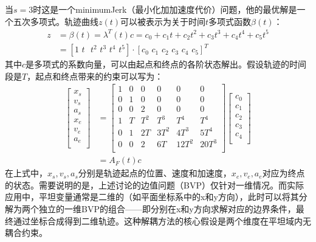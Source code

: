 \documentclass[master,academic]{ysuthesis} %
\begin{document}
		当$s=3$时这是一个minimumJerk（最小化加加速度代价）问题，他的最优解是一个五次多项式\cite{wang2022geometrically}。轨迹曲线$z(t)$可以被表示为关于时间$t$多项式函数$\beta(t)$：
		\begin{equation}
			\begin{aligned}
				z&=\beta (t) =\lambda ^T(t) c=c_0+c_1t+c_2t^2+c_3t^3+c_4t^4+c_5t^5\\
				&=\left[ 1\,\,t\,\,\,\,t^2\,\,t^3\,\,t^4\,\,t^5 \right] \cdot \left[ c_0\,\,c_1\,\,c_2\,\,c_3\,\,c_4\,\,c_5 \right] ^T
			\end{aligned}
		\end{equation}
		其中$c$是多项式的系数向量，可以由起点和终点的各阶状态解出。假设轨迹的时间段是$T$，起点和终点带来的约束可以写为：
		\begin{equation}
			\begin{aligned}
				\left[ \begin{array}{c}
				x_s\\
				v_s\\
				a_s\\
				x_e\\
				v_e\\
				a_e\\
				\end{array} \right] 
				&=\left[ \begin{matrix}
				1&		0&		0&		0&		0&		0\\
				0&		1&		0&		0&		0&		0\\
				0&		0&		2&		0&		0&		0\\
				1&		T&		T^2&		T^3&		T^4&		T^4\\
				0&		1&		2T&		3T^2&		4T^3&		5T^4\\
				0&		0&		2&		6T&		12T^2&		20T^3\\
				\end{matrix} \right] \left[ \begin{array}{c}
				c_0\\
				c_1\\
				c_2\\
				c_3\\
				c_4\\
				\end{array} \right] \\
				&=A_F(t) c
			\end{aligned}
			\label{eq:BVP}
		\end{equation}
		在上式中，$x_s,v_s,a_s$分别是轨迹起点的位置、速度和加速度，$x_e,v_e,a_e$对应为终点的状态。需要说明的是，上述讨论的边值问题（BVP）仅针对一维情况。而实际应用中，平坦变量通常是二维的（如平面坐标系中的x和y方向），此时可以将其分解为两个独立的一维BVP的组合——即分别在x和y方向求解对应的边界条件，最终通过坐标合成得到二维轨迹。这种解耦方法的核心假设是两个维度在平坦域内无耦合约束。
		
\end{document}
